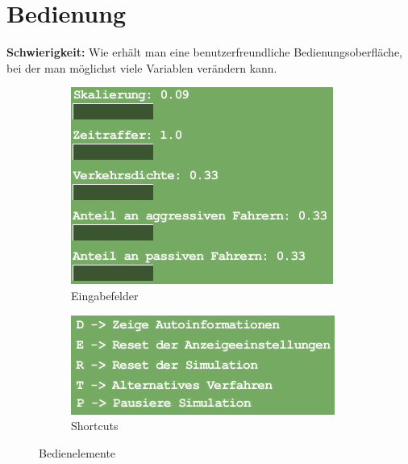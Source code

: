 \section{Bedienung}
\textbf{Schwierigkeit:} Wie erhält man eine benutzerfreundliche Bedienungsoberfläche, bei der man möglichst viele Variablen verändern kann.
\begin{addmargin}[25pt]{0pt}
	\begin{figure}
		\begin{subfigure}{0.5\linewidth}
			\centering
			\includegraphics[width=\linewidth]{images/Eingabe}
			\caption*{Eingabefelder}
			\label{fig:eingabe}
		\end{subfigure}
		\begin{subfigure}{0.5\linewidth}
			\centering
			\includegraphics[width=\linewidth]{images/Bedienung}
			\caption*{Shortcuts}
			\label{fig:shortcuts}
		\end{subfigure}
	\caption{Bedienelemente}
	\label{fig:bedienung}
	\end{figure}
	

\end{addmargin}
